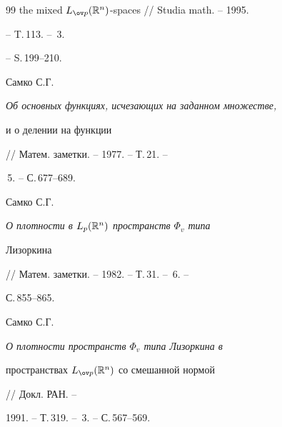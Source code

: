 \begin{thebibliography}{99}
{the mixed $L_{\ov p}(\Bbb R^n)$-spaces} // Studia math. -- 1995.


-- T.\,113. -- \No\,3.


-- S.\,199--210.




Самко С.Г. {\em Об основных функциях, исчезающих на заданном множестве,


и о делении на функции} // Матем. заметки. -- 1977. -- Т.\,21. --


\No\,5. -- С.\,677--689.




Самко С.Г. {\em О плотности в $L_p(\Bbb R^n)$ пространств $\Phi_v$ типа


Лизоркина} // Матем. заметки. -- 1982. -- Т.\,31. -- \No\,6. --


С.\,855--865.




Самко С.Г. {\em О плотности пространств $\Phi_v$ типа Лизоркина в


пространствах $L_{\ov p}(\Bbb R^n)$ со смешанной нормой} // Докл. РАН. --


1991. -- Т.\,319. -- \No\,3. -- С.\,567--569.








\end{thebibliography}





\vskip 2cm












\label{end}






